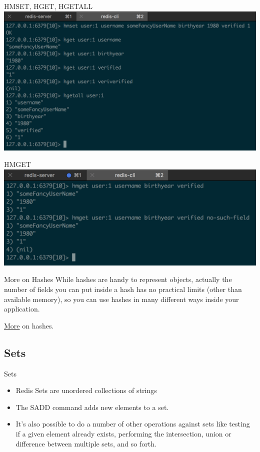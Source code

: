 \documentclass[10pt]{beamer}
\begin{document}
\begin{frame}[fragile]{HMSET, HGET, HGETALL}
  \includegraphics[scale=0.5]{img/hmset-hget-hgetall}
\end{frame}

\begin{frame}[fragile]{HMGET}
  \includegraphics[scale=0.5]{img/hmget}
\end{frame}

\begin{frame}[fragile]{More on Hashes}
  While hashes are handy to represent objects, actually the number of fields
  you can put inside a hash has no practical limits (other than available
  memory), so you can use hashes in many different ways inside your application.

  \href{https://redis.io/commands#hash}{More} on hashes.
\end{frame}

\subsection{Sets}

\begin{frame}[fragile]{Sets}
  \begin{itemize}
    \item Redis Sets are unordered collections of strings
    \item The SADD command adds new elements to a set.
    \item It's also possible to do a number of other operations against sets
    like testing if a given element already exists, performing the intersection,
    union or difference between multiple sets, and so forth.
  \end{itemize}
\end{frame}
\end{document}
